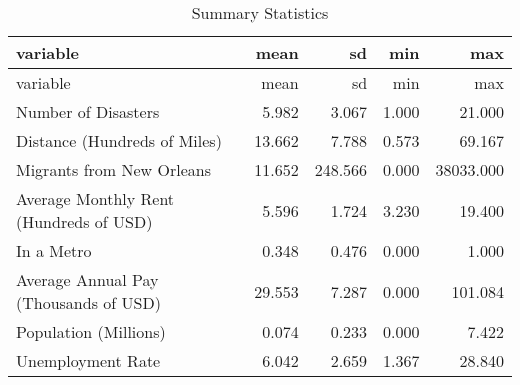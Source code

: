 \documentclass[]{article}
\begin{document}
\clearpage

\begin{longtable}[]{@{}lrrrr@{}}
\caption{Summary Statistics \label{tab:sumstats}}\tabularnewline
\toprule
variable & mean & sd & min & max\tabularnewline
\midrule
\endfirsthead
\toprule
variable & mean & sd & min & max\tabularnewline
\midrule
\endhead
Number of Disasters & 5.982 & 3.067 & 1.000 & 21.000\tabularnewline
Distance (Hundreds of Miles) & 13.662 & 7.788 & 0.573 &
69.167\tabularnewline
Migrants from New Orleans & 11.652 & 248.566 & 0.000 &
38033.000\tabularnewline
Average Monthly Rent (Hundreds of USD) & 5.596 & 1.724 & 3.230 &
19.400\tabularnewline
In a Metro & 0.348 & 0.476 & 0.000 & 1.000\tabularnewline
Average Annual Pay (Thousands of USD) & 29.553 & 7.287 & 0.000 &
101.084\tabularnewline
Population (Millions) & 0.074 & 0.233 & 0.000 & 7.422\tabularnewline
Unemployment Rate & 6.042 & 2.659 & 1.367 & 28.840\tabularnewline
\bottomrule
\end{longtable}

\clearpage

\clearpage
\scriptsize
\end{document}
